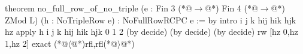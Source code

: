 theorem no_full_row_of_no_triple (e : Fin 3 (*@$\to$@*) Fin 4 (*@$\to$@*) ZMod L) (h : NoTripleRow e) :
    NoFullRowRCPC e := by
  intro i j k hij hik hjk hz
  apply h i j k hij hik hjk 0 1 2 (by decide) (by decide) (by decide)
  rw [hz 0,hz 1,hz 2]
  exact (*@$\langle$@*)rfl,rfl(*@$\rangle$@*)

